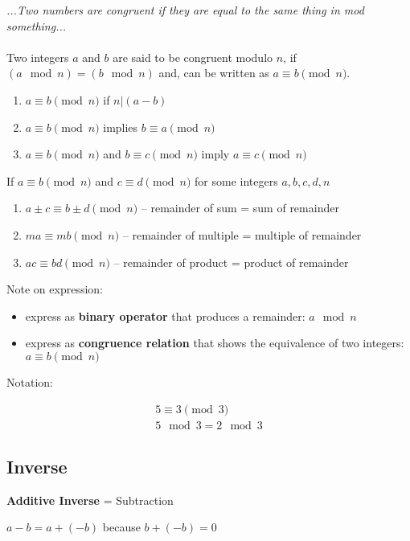 \documentclass[a4paper]{article}
\begin{document}
\textit{...Two numbers are congruent if they are equal to the same thing in mod something...}
\\
\\
Two integers $a$ and $b$ are said to be congruent modulo $n$, if $(a \mod n) = (b \mod n)$ and, can be written as $a \equiv b \pmod{n}$.

\begin{enumerate}
\item $a \equiv b \pmod{n}$ if $n|(a - b)$
\item $a \equiv b \pmod{n}$ implies $b \equiv a \pmod{n}$
\item $a \equiv b \pmod{n}$ and $b \equiv c \pmod{n}$ imply $a \equiv c \pmod{n}$ 
\end{enumerate}

If $a \equiv b \pmod{n}$ and $c \equiv d \pmod{n}$ for some integers $a,b,c,d,n$

\begin{enumerate}
\item $a \pm c \equiv b \pm d \pmod{n}$ -- remainder of sum = sum of remainder
\item $ma \equiv mb \pmod{n}$ -- remainder of multiple = multiple of remainder
\item $ac \equiv bd \pmod{n}$ -- remainder of product = product of remainder
\end{enumerate}


Note on expression:
\begin{itemize}
\item express as \textbf{binary operator} that produces a remainder: $a \mod n$
\item express as \textbf{congruence relation} that shows the equivalence of two integers: $a \equiv b \pmod{n}$
\end{itemize}

Notation:

\begin{align*}
5 \equiv 3 \pmod{3} \\
5 \mod 3 = 2 \mod 3
\end{align*}

\subsection{Inverse}

\textbf{Additive Inverse} = Subtraction

$a - b = a + (-b)$ because $b + (-b) = 0$
\end{document}
